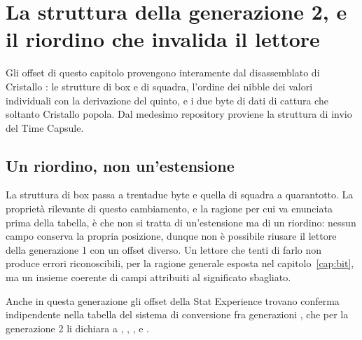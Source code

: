 
\chapter{La struttura della generazione 2, e il riordino che invalida il lettore}
\label{cap:gen2}

Gli offset di questo capitolo provengono interamente dal disassemblato di Cristallo \cite{pokecrystal}: le strutture di box e di squadra, l'ordine dei nibble dei valori individuali con la derivazione del quinto, e i due byte di dati di cattura che soltanto Cristallo popola. Dal medesimo repository proviene la struttura di invio del Time Capsule.

\section{Un riordino, non un'estensione}

La struttura di box passa a trentadue byte e quella di squadra a quarantotto. La proprietà rilevante di questo cambiamento, e la ragione per cui va enunciata prima della tabella, è che non si tratta di un'estensione ma di un riordino: nessun campo conserva la propria posizione, dunque non è possibile riusare il lettore della generazione 1 con un offset diverso. Un lettore che tenti di farlo non produce errori riconoscibili, per la ragione generale esposta nel capitolo~\ref{cap:bit}, ma un insieme coerente di campi attribuiti al significato sbagliato.

Anche in questa generazione gli offset della Stat Experience trovano conferma indipendente nella tabella del sistema di conversione fra generazioni \cite{pccs}, che per la generazione 2 li dichiara a , , ,  e .

